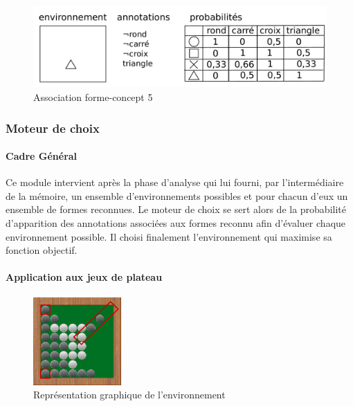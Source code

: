 \begin{figure}[H] 
\includegraphics[width=\textwidth]{files/raisonneur/annotations_5} 
\caption{Association forme-concept 5} 
\label{img_annotations_5}
\end{figure}



\subsubsection{Moteur de choix}

\paragraph{Cadre Général}


Ce module intervient après la phase d'analyse qui lui fourni, par l'intermédiaire de la mémoire, un ensemble d'environnements possibles et pour chacun d'eux un ensemble de formes reconnues. Le \og moteur de choix \fg{} se sert alors de la probabilité d'apparition des annotations associées aux formes reconnu afin d'évaluer chaque environnement possible. Il choisi finalement l'environnement qui maximise sa fonction objectif.

\paragraph{Application aux jeux de plateau}


\begin{figure}[H] 
\includegraphics[width=0.3\textwidth]{files/raisonneur/moteur_de_choix} 
\caption{Représentation graphique de l'environnement} 
\label{cbs_reco0}
\end{figure}
